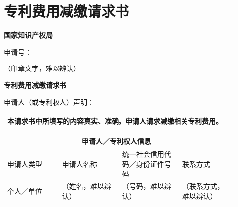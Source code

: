 \documentclass[UTF8,10pt,a4paper,fontset=fandol]{ctexart}
\newcommand{\fieldvalue}[1]{#1}
\newcommand{\handwritten}[1]{#1}
\begin{document}
\vfill


\newpage

\section*{专利费用减缴请求书}

\noindent
\textbf{国家知识产权局}

\noindent
申请号：\underline{\hspace{5cm}}

\noindent
\handwritten{（印章文字，难以辨认）}

\begin{center}
\textbf{专利费用减缴请求书}
\end{center}

\noindent
申请人（或专利权人）声明：

\begin{tabular}{|p{0.92\linewidth}|}
\hline
本请求书中所填写的内容真实、准确。申请人请求减缴相关专利费用。\\
\hline
\end{tabular}

\vspace{0.4em}

\begin{tabular}{|p{0.22\linewidth}|p{0.24\linewidth}|p{0.24\linewidth}|p{0.20\linewidth}|}
\hline
\multicolumn{4}{|c|}{申请人／专利权人信息}\\
\hline
申请人类型 & 申请人名称 & 统一社会信用代码／身份证件号码 & 联系方式\\
\hline
个人／单位 &
\fieldvalue{\handwritten{（姓名，难以辨认）}} &
\fieldvalue{\handwritten{（号码，难以辨认）}} &
\fieldvalue{\handwritten{（联系方式，难以辨认）}}\\
\hline
\end{tabular}

\vspace{0.6em}
\end{document}
